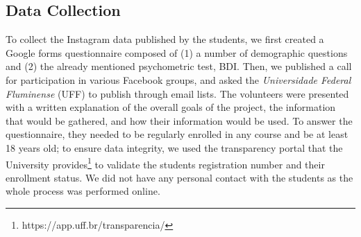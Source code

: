 \documentclass[letterpaper]{article} \usepackage{aaai20}  \usepackage{times}  \usepackage{helvet} \usepackage{courier}  \usepackage[hyphens]{url}  \usepackage{graphicx} \urlstyle{rm} \def\UrlFont{\rm}  \usepackage{graphicx}  \frenchspacing  \setlength{\pdfpagewidth}{8.5in}  \setlength{\pdfpageheight}{11in}  \usepackage[final]{changes}
\begin{document}
\subsection{Data Collection}
To collect the Instagram data published by the students, we first created a Google forms questionnaire composed of (1) a number of demographic questions and (2) the already mentioned psychometric test, BDI. Then, we published a call for participation in various Facebook groups, and  asked the \textit{Universidade Federal Fluminense} (UFF) to publish  through  email lists. The volunteers were presented with a written explanation of the overall goals of the project, the information that would be gathered, and how their information would be used. To answer the questionnaire, they needed to be regularly enrolled in any course  and be at least 18 years old; to ensure data integrity, we used the transparency portal that the University provides{\footnote{https://app.uff.br/transparencia/}} to validate the students registration number and their enrollment status. We did not have any personal contact with the students as the whole process was performed online.  
\end{document}
